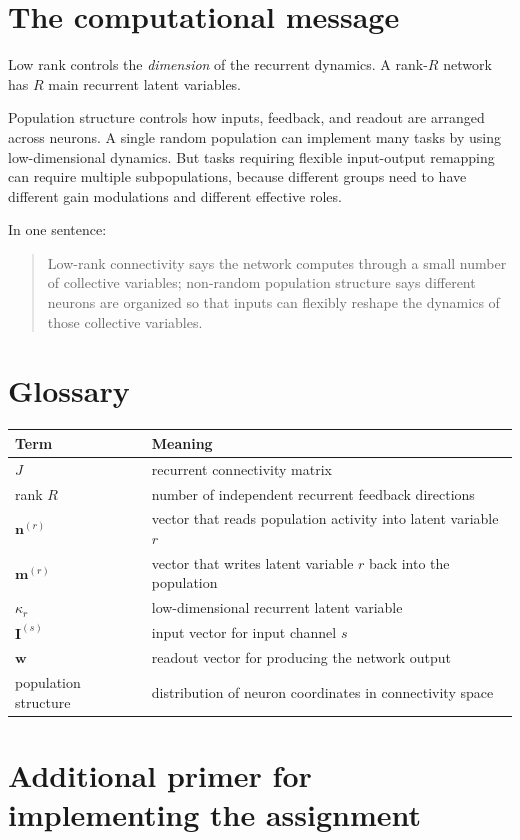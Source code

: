 \documentclass[11pt]{article}
\newcommand{\vm}{\mathbf{m}}
\newcommand{\vn}{\mathbf{n}}
\newcommand{\vI}{\mathbf{I}}
\newcommand{\vw}{\mathbf{w}}
\begin{document}
\section{The computational message}

Low rank controls the \emph{dimension} of the recurrent dynamics. A rank-$R$
network has $R$ main recurrent latent variables.

Population structure controls how inputs, feedback, and readout are arranged
across neurons. A single random population can implement many tasks by using
low-dimensional dynamics. But tasks requiring flexible input-output remapping can
require multiple subpopulations, because different groups need to have different
gain modulations and different effective roles.

In one sentence:

\begin{quote}
Low-rank connectivity says the network computes through a small number of
collective variables; non-random population structure says different neurons are
organized so that inputs can flexibly reshape the dynamics of those collective
variables.
\end{quote}

\section*{Glossary}

\begin{tabular}{@{}ll@{}}
\toprule
Term & Meaning \\
\midrule
$J$ & recurrent connectivity matrix \\
rank $R$ & number of independent recurrent feedback directions \\
$\vn^{(r)}$ & vector that reads population activity into latent variable $r$ \\
$\vm^{(r)}$ & vector that writes latent variable $r$ back into the population \\
$\kappa_r$ & low-dimensional recurrent latent variable \\
$\vI^{(s)}$ & input vector for input channel $s$ \\
$\vw$ & readout vector for producing the network output \\
population structure & distribution of neuron coordinates in connectivity space \\
\bottomrule
\end{tabular}

\clearpage
\section{Additional primer for implementing the assignment}
\end{document}

